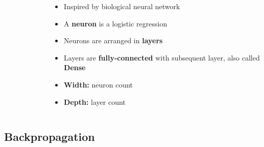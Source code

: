 \documentclass[aspectratio=1610]{beamer}
\begin{document}
\begin{frame}
\begin{columns}
\begin{column}{0.48\textwidth}
\begin{figure}
        \end{figure}
    \end{column}
    \begin{column}{0.48\textwidth}
        \begin{itemize}
            \item Inspired by biological neural network
            \item A \textbf{neuron} is a logistic regression
            \item Neurons are arranged in \textbf{layers}
            \item Layers are \textbf{fully-connected} with subsequent layer, also called \textbf{Dense}
            \item \textbf{Width:} neuron count
            \item \textbf{Depth:} layer count
        \end{itemize}
    \end{column}
\end{columns}
\end{frame}

\subsection{Backpropagation}
\label{subsec:backpropagation}
\end{document}
